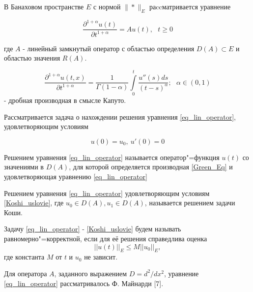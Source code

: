 
\vzmscaption


В Банаховом пространстве $E$ с нормой $\|*\|_E$ раccматривается уравнение

\begin{equation}\label{eq_lin_operator}
	\frac{\partial^{1+\alpha} u(t)}{\partial t^{1+\alpha}} = Au(t), \ \ \ t \geqslant 0
\end{equation}

где $A$ - линейный замкнутый оператор с областью определения $D(A) \subset E$ и областью значения $R(A)$.

\begin{equation}\label{Green_Eq}
        \frac{\partial^{1+\alpha}u(t,x)}{\partial t^{1+\alpha}} = \frac{1}{\Gamma(1-\alpha)} \int\limits_0^t \frac{u''(s)ds}{(t - s)^{\alpha}}; \ \ \ \alpha \in (0, 1)
\end{equation}
 - дробная производная в смысле Капуто.
\vspace{3mm}


Рассматривается задача о нахождении решения уравнения \ref{eq_lin_operator}, удовлетворяющим условиям

\begin{equation}\label{Koshi_uslovie}
	u(0) = u_0, \ u'(0) = 0
\end{equation}

\begin{definition}
	Решением уравнения \ref{eq_lin_operator} называется оператор"=функция $u(t)$ со значениями в $D(A)$, для которой определяется производная \ref{Green_Eq} и удовлетворяющая уравнению \ref{eq_lin_operator}
\end{definition}

\begin{definition}
	Решением уравнения \ref{eq_lin_operator} удовлетворяющим условиям \ref{Koshi_uslovie}, где $u_0 \in D(A), u_1 \in D(A)$, называется решением задачи Коши.
\end{definition}

\begin{definition}
	Задачу \ref{eq_lin_operator} - \ref{Koshi_uslovie} будем называть равномерно"=корректной, если для её решения справедлива оценка
	\begin{equation}\label{ocenka}
		||u(t)||_E \leq M||u_0||_E,
	\end{equation}
	где константа $M$ от $t$ и $u_0$ не зависит.
\end{definition}
Для оператора $A$, заданного выражением $D=d^2/dx^2$, уравнение \ref{eq_lin_operator} рассматривалось Ф. Майнарди [7].
\vspace{3mm}


